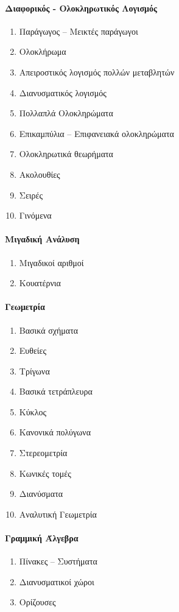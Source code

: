 \documentclass[twoside,nofonts,internet,shmeiwseis]{thewria}
\begin{document}
\paragraph{Διαφορικός - Ολοκληρωτικός Λογισμός}
\begin{enumerate}[resume]
\item Παράγωγος – Μεικτές παράγωγοι
\item Ολοκλήρωμα
\item Απειροστικός λογισμός πολλών μεταβλητών
\item Διανυσματικός λογισμός
\item Πολλαπλά Ολοκληρώματα
\item Επικαμπύλια – Επιφανειακά ολοκληρώματα
\item Ολοκληρωτικά θεωρήματα
\item Ακολουθίες
\item Σειρές
\item Γινόμενα
\end{enumerate}
\paragraph{Μιγαδική Ανάλυση}
\begin{enumerate}[resume]
\item Μιγαδικοί αριθμοί
\item Κουατέρνια
\end{enumerate}
\paragraph{Γεωμετρία}
\begin{enumerate}[resume]
\item Βασικά σχήματα
\item Ευθείες
\item Τρίγωνα
\item Βασικά τετράπλευρα
\item Κύκλος
\item Κανονικά πολύγωνα
\item Στερεομετρία
\item Κωνικές τομές
\item Διανύσματα
\item Αναλυτική Γεωμετρία
\end{enumerate}
\paragraph{Γραμμική Άλγεβρα}
\begin{enumerate}[resume]
\item Πίνακες – Συστήματα
\item Διανυσματικοί χώροι
\item Ορίζουσες
\end{enumerate}
\end{document}
